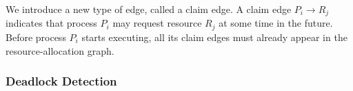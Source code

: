 We introduce a new type of edge, called a claim edge.
A claim edge $P_{i} \rightarrow R_{j}$ indicates that process $P_{i}$ may request resource $R_{j}$ at some time in the future.
Before process $P_{i}$ starts executing, all its claim edges must already appear in the resource-allocation graph.

\subsubsection{Deadlock Detection}\label{subsubsec:Deadlock_Detection}

